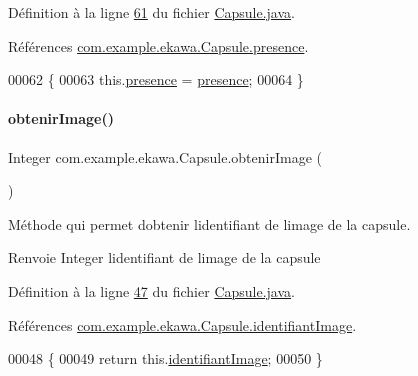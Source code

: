 Définition à la ligne \hyperlink{_capsule_8java_source_l00061}{61} du fichier \hyperlink{_capsule_8java_source}{Capsule.\+java}.



Références \hyperlink{_capsule_8java_source_l00020}{com.\+example.\+ekawa.\+Capsule.\+presence}.


\begin{DoxyCode}
00062     \{
00063         this.\hyperlink{classcom_1_1example_1_1ekawa_1_1_capsule_a351ef1f4b4258f4651d24b206fc38a94}{presence} = \hyperlink{classcom_1_1example_1_1ekawa_1_1_capsule_a351ef1f4b4258f4651d24b206fc38a94}{presence};
00064     \}
\end{DoxyCode}
\mbox{\label{classcom_1_1example_1_1ekawa_1_1_capsule_ab03475c7f750fd6319a5899da8393252}} 
\paragraph{\texorpdfstring{obtenir\+Image()}{obtenirImage()}}
{\footnotesize\ttfamily Integer com.\+example.\+ekawa.\+Capsule.\+obtenir\+Image (\begin{DoxyParamCaption}{ }\end{DoxyParamCaption})}



Méthode qui permet d\textquotesingle{}obtenir l\textquotesingle{}identifiant de l\textquotesingle{}image de la capsule. 

\begin{DoxyReturn}{Renvoie}
Integer l\textquotesingle{}identifiant de l\textquotesingle{}image de la capsule 
\end{DoxyReturn}


Définition à la ligne \hyperlink{_capsule_8java_source_l00047}{47} du fichier \hyperlink{_capsule_8java_source}{Capsule.\+java}.



Références \hyperlink{_capsule_8java_source_l00019}{com.\+example.\+ekawa.\+Capsule.\+identifiant\+Image}.


\begin{DoxyCode}
00048     \{
00049         \textcolor{keywordflow}{return} this.\hyperlink{classcom_1_1example_1_1ekawa_1_1_capsule_a05fa50e416ea3a48d6b8dab73174c9d0}{identifiantImage};
00050     \}
\end{DoxyCode}
\mbox{\label{classcom_1_1example_1_1ekawa_1_1_capsule_a56668990154945141a80702633efc123}} 
